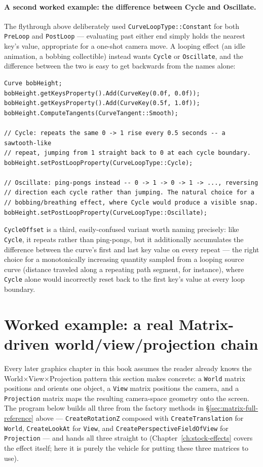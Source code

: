 \paragraph{A second worked example: the difference between Cycle and Oscillate.}
The flythrough above deliberately used \texttt{CurveLoopType::Constant} for both
\texttt{PreLoop} and \texttt{PostLoop} --- evaluating past either end simply holds the nearest
key's value, appropriate for a one-shot camera move. A looping effect (an idle animation, a
bobbing collectible) instead wants \texttt{Cycle} or \texttt{Oscillate}, and the difference
between the two is easy to get backwards from the names alone:

\begin{lstlisting}
Curve bobHeight;
bobHeight.getKeysProperty().Add(CurveKey(0.0f, 0.0f));
bobHeight.getKeysProperty().Add(CurveKey(0.5f, 1.0f));
bobHeight.ComputeTangents(CurveTangent::Smooth);

// Cycle: repeats the same 0 -> 1 rise every 0.5 seconds -- a sawtooth-like
// repeat, jumping from 1 straight back to 0 at each cycle boundary.
bobHeight.setPostLoopProperty(CurveLoopType::Cycle);

// Oscillate: ping-pongs instead -- 0 -> 1 -> 0 -> 1 -> ..., reversing
// direction each cycle rather than jumping. The natural choice for a
// bobbing/breathing effect, where Cycle would produce a visible snap.
bobHeight.setPostLoopProperty(CurveLoopType::Oscillate);
\end{lstlisting}

\texttt{CycleOffset} is a third, easily-confused variant worth naming precisely: like
\texttt{Cycle}, it repeats rather than ping-pongs, but it additionally accumulates the
difference between the curve's first and last key value on every repeat --- the right choice
for a monotonically increasing quantity sampled from a looping source curve (distance
traveled along a repeating path segment, for instance), where \texttt{Cycle} alone would
incorrectly reset back to the first key's value at every loop boundary.

\section{Worked example: a real Matrix-driven world/view/projection chain}
\label{sec:worked-examples}

Every later graphics chapter in this book assumes the reader already knows the
World$\times$View$\times$Projection pattern this section makes concrete: a \texttt{World}
matrix positions and orients one object, a \texttt{View} matrix positions the camera, and a
\texttt{Projection} matrix maps the resulting camera-space geometry onto the screen. The
program below builds all three from the factory methods in
\S\ref{sec:matrix-full-reference} above --- \texttt{CreateRotationZ} composed with
\texttt{CreateTranslation} for \texttt{World}, \texttt{CreateLookAt} for \texttt{View}, and
\texttt{CreatePerspectiveFieldOfView} for \texttt{Projection} --- and hands all three straight
to  (Chapter~\ref{ch:stock-effects} covers the effect itself; here it is
purely the vehicle for putting these three matrices to use).

